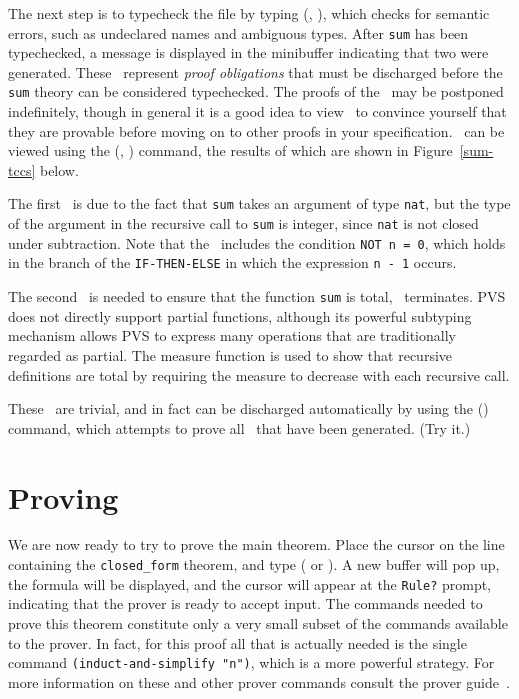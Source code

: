 
The next step is to typecheck the file by typing 
(, ), which checks for semantic errors, such as
undeclared names and ambiguous types.  After \texttt{sum} has been
typechecked, a message is displayed in the minibuffer indicating that two
\tccs{} were generated.  These \tccs\ represent
\emph{proof obligations} that must be discharged
before the \texttt{sum} theory can be considered typechecked.  The proofs
of the \tccs\ may be postponed indefinitely, though in general it is a
good idea to view \tccs\ to convince yourself that they are provable
before moving on to other proofs in your specification.  \tccs\ can be
viewed using the  (, )
command, the results of which are shown in Figure~\ref{sum-tccs} below.


The first \tcc\ is due to the fact that \texttt{sum} takes an argument of
type \texttt{nat}, but the type of the argument in the recursive call to
\texttt{sum} is integer, since \texttt{nat} is not closed under subtraction.
Note that the \tcc\ includes the condition \texttt{NOT n = 0}, which holds
in the branch of the \texttt{IF-THEN-ELSE} in which the expression
\texttt{n - 1} occurs.

The second \tcc\ is needed to ensure that the function \texttt{sum} is
total, \ie\ terminates.  PVS does not directly support partial functions,
although its powerful subtyping mechanism allows PVS to express many
operations that are traditionally regarded as partial.  The measure
function is used to show that recursive definitions are total by requiring
the measure to decrease with each recursive call.

These \tccs\ are trivial, and in fact can be discharged automatically by
using the  () command, which attempts to
prove all \tccs\ that have been generated.  (Try it.)

\section{Proving}

We are now ready to try to prove the main theorem.  Place the cursor on
the line containing the \texttt{closed\_form} theorem, and type
 ( or ).  A new buffer will pop up, the
formula will be displayed, and the cursor will appear at the
\texttt{Rule?}  prompt, indicating that the prover is ready to accept
input.  The commands needed to prove this theorem constitute only a very
small subset of the commands available to the prover.  In fact, for this
proof all that is actually needed is the single command
\texttt{(induct-and-simplify "n")}, which is a more powerful strategy.
For more information on these and other prover commands consult the prover
guide~\cite{PVS:prover}.

